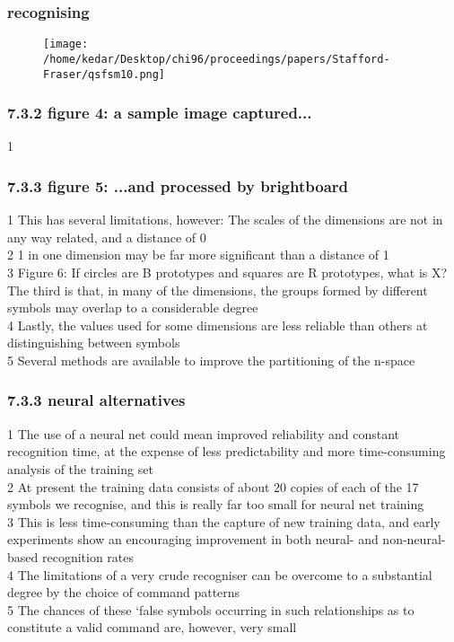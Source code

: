 \documentclass{beamer}
\begin{document}
\begin{frame}
\frametitle{recognising}
\begin{figure}\texttt{[image: /home/kedar/Desktop/chi96/proceedings/papers/Stafford-Fraser/qsfsm10.png]}\end{figure}\end{frame}
\begin{frame}
\frametitle{7.3.2 figure 4: a sample image captured... }
1                                 \\
\end{frame}
\begin{frame}
\frametitle{7.3.3 figure 5: ...and processed by brightboard }
1  This has several limitations, however:          The scales of the dimensions are not in any way related, and a distance of 0 \\2 1 in one dimension may be far more significant than a distance of 1 \\3                         Figure 6: If circles are B prototypes and squares are R prototypes, what is X?               The third is that, in many of the dimensions, the groups formed by different symbols may overlap to a considerable degree \\4               Lastly, the values used for some dimensions are less reliable than others at distinguishing between symbols \\5       Several methods are available to improve the partitioning of the    n-space \\
\end{frame}
\begin{frame}
\frametitle{7.3.3 neural alternatives}
1  The use of a neural net could mean improved reliability and constant recognition time, at the expense of less predictability and more time-consuming analysis of the training set \\2  At present the training data consists of about 20 copies of each of the 17 symbols we recognise, and this is really far too small for neural net training \\3  This is less time-consuming than the capture of new training data, and early experiments show an encouraging improvement in both neural- and non-neural-based recognition rates \\4      The limitations of a very crude recogniser can be overcome to a substantial degree by the choice of command patterns \\5  The chances of these `false symbols occurring in such relationships as to constitute a valid command are, however, very small \\
\end{frame}
\end{document}
